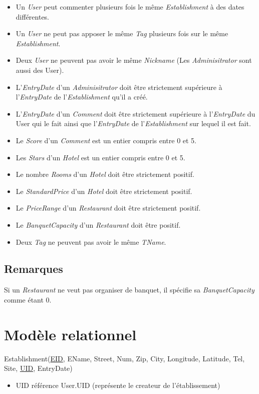 \documentclass[11pt,a4paper]{report}
\begin{document}
\begin{itemize}
\item Un \textit{User} peut commenter plusieurs fois le même \textit{Establishment} à des dates différentes. 
\item Un \textit{User} ne peut pas apposer le même \textit{Tag} plusieurs fois sur le même \textit{Establishment}.
\item Deux \textit{User} ne peuvent pas avoir le même \textit{Nickname} (Les \textit{Adminisitrator} sont aussi des User).
\item L'\textit{EntryDate} d'un \textit{Adminisitrator} doit être strictement supérieure à l'\textit{EntryDate} de l'\textit{Establishment} qu'il a créé.
\item L'\textit{EntryDate} d'un \textit{Comment} doit être strictement supérieure à l'\textit{EntryDate} du User qui le fait ainsi que l'\textit{EntryDate} de l'\textit{Establishment} sur lequel il est fait. 
\item Le \textit{Score} d'un \textit{Comment} est un entier compris entre 0 et 5.
\item Les \textit{Stars} d'un \textit{Hotel} est un entier compris entre 0 et 5.
\item Le nombre \textit{Rooms} d'un \textit{Hotel} doit être strictement positif. 
\item Le \textit{StandardPrice} d'un \textit{Hotel} doit être strictement positif. 
\item Le \textit{PriceRange} d'un \textit{Restaurant} doit être strictement positif. 
\item Le \textit{BanquetCapacity} d'un \textit{Restaurant} doit être positif. 
\item Deux \textit{Tag} ne peuvent pas avoir le même \textit{TName}.
\end{itemize}
\subsection*{Remarques}
Si un \textit{Restaurant} ne veut pas organiser de banquet, il spécifie sa \textit{BanquetCapacity} comme étant 0.

\section*{Modèle relationnel}
\noindent

Establishment(\underline{EID}, EName, Street, Num, Zip, City, Longitude, Latitude, Tel, Site, \underline{UID}, EntryDate)
\begin{itemize}
\item UID référence User.UID (représente le createur de l'établissement)\\
\end{itemize}
\end{document}
